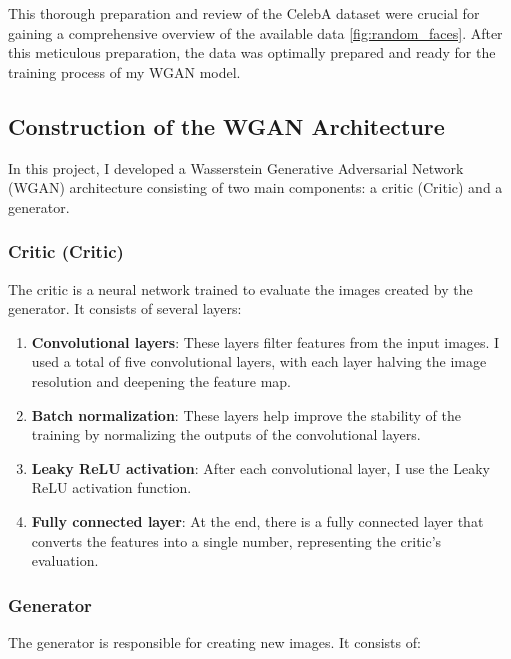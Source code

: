 \documentclass[a4paper, 12pt]{article}
\begin{document}
This thorough preparation and review of the CelebA dataset were crucial for gaining a comprehensive overview of the available data \ref{fig:random_faces}. After this meticulous preparation, the data was optimally prepared and ready for the training process of my WGAN model.

\subsection{Construction of the WGAN Architecture}

In this project, I developed a Wasserstein Generative Adversarial Network (WGAN) architecture consisting of two main components: a critic (Critic) and a generator.

\subsubsection{Critic (Critic)}

The critic is a neural network trained to evaluate the images created by the generator. It consists of several layers:

\begin{enumerate}
    \item \textbf{Convolutional layers}: These layers filter features from the input images. I used a total of five convolutional layers, with each layer halving the image resolution and deepening the feature map.
    \item \textbf{Batch normalization}: These layers help improve the stability of the training by normalizing the outputs of the convolutional layers.
    \item \textbf{Leaky ReLU activation}: After each convolutional layer, I use the Leaky ReLU activation function.
   

 \item \textbf{Fully connected layer}: At the end, there is a fully connected layer that converts the features into a single number, representing the critic's evaluation.
\end{enumerate}

\subsubsection{Generator}

The generator is responsible for creating new images. It consists of:
\end{document}
